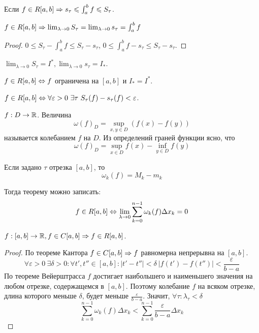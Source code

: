\begin{Rem}
	Если $f \in R[a, b] \Rightarrow s_\tau \leqslant \int_a^b f \leqslant S_\tau$. 
\end{Rem}

\begin{Cons}
	$f \in R[a, b] \Rightarrow \lim_{\lambda \to 0} S_\tau = \lim_{\lambda \to 0} s_\tau = \int_a^b f$ 
\end{Cons}

\begin{proof}
	$0 \leqslant S_\tau - \int_a^b f \leqslant S_\tau - s_\tau$, $0 \leqslant \int_a^b f - s_\tau \leqslant S_\tau - s_\tau$.
\end{proof}

\begin{Rem}
	$\lim_{\lambda \to 0} S_\tau = I^*, \lim_{\lambda \to 0} s_\tau = I_*$. 
\end{Rem}

\begin{Prop}
	$f \in R[a, b] \Leftrightarrow f$ ограничена на $[a, b]$ и $I_* = I^*$. 
\end{Prop}

\begin{Prop}
	$f \in R[a, b] \Leftrightarrow \forall \varepsilon > 0 \ \exists \tau \ S_\tau(f) - s_\tau (f) < \varepsilon$. 
\end{Prop}

\begin{Def}
	$f : D \to \mathbb{R}$. Величина
	\[\omega (f)_D = \sup_{x, y \in D} (f(x) - f(y))\]
	называется колебанием $f$ на $D$. Из определений граней функции ясно, что
	\[\omega (f)_D = \sup_{x \in D} f(x) - \inf_{y \in D} f(y)\]

	Если задано $\tau$ отрезка $[a, b]$, то 
	\[\omega_k (f) = M_k - m_k\]
\end{Def}

Тогда теорему можно записать:
\[f \in R[a, b] \Leftrightarrow \lim_{\lambda \to 0} \sum_{k = 0}^{n - 1} \omega_k (f) \Delta x_k = 0\]

\begin{Thm}
	$f : [a, b] \to \mathbb{R}, f \in C[a, b] \Rightarrow f \in R[a, b]$.
\end{Thm}

\begin{proof}
	По теореме Кантора $f \in C[a, b] \Rightarrow f$ равномерна непрерывна на $[a, b]$.
	\[\forall \varepsilon > 0 \ \exists \delta > 0 : \forall t', t'' \in [a, b] : |t' - t''| < \delta \ |f(t') - f(t'')| < \frac{\varepsilon}{b - a}\]
	По теореме Вейерштрасса $f$ достигает наибольшего и наименьшего значения на любом отрезке, содержащемся в $[a, b]$.
	Поэтому колебание $f$ на всяком отрезке, длина которого меньше $\delta$, будет меньше $\frac{\varepsilon}{b - a}$. Значит, $\forall \tau : \lambda_\tau < \delta$ 
	\[\sum_{k = 0}^{n - 1} \omega_k(f) \Delta x_k < \sum_{k = 0}^{n - 1} \frac{\varepsilon}{b - a} \Delta x_k\]
\end{proof}

